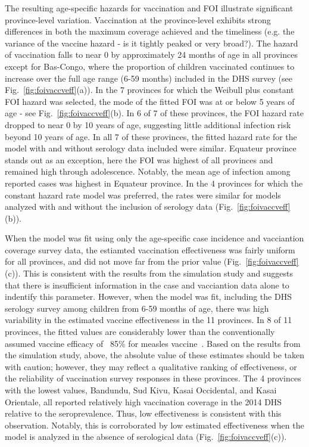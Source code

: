 \documentclass[nofootinbib,aps,pre,twocolumn,superscriptaddress,showkeys,showpacs]{revtex4-1}
\begin{document}
The resulting age-specific hazards for vaccination and FOI illustrate significant province-level variation.  Vaccination at the province-level exhibits strong differences in both the maximum coverage achieved and the timeliness (e.g. the variance of the vaccine hazard - is it tightly peaked or very broad?).  The hazard of vaccination falls to near 0 by approximately 24 months of age in all provinces except for Bas-Congo, where the proportion of children vaccinated continues to increase over the full age range (6-59 months) included in the DHS survey (see Fig.~\ref{fig:foivaccveff}(a)). In the 7 provinces for which the Weibull plus constant FOI hazard was selected, the mode of the fitted FOI was at or below 5 years of age - see Fig.~\ref{fig:foivaccveff}(b).  In 6 of 7 of these provinces, the FOI hazard rate dropped to near 0 by 10 years of age, suggesting little additional infection risk beyond 10 years of age.  In all 7 of these provinces, the fitted hazard rate for the model with and without serology data included were similar.  Equateur province stands out as an exception, here the FOI was highest of all provinces and remained high through adolescence. Notably, the mean age of infection among reported cases was highest in Equateur province. In the 4 provinces for which the constant hazard rate model was preferred, the rates were similar for models analyzed with and without the inclusion of serology data (Fig.~\ref{fig:foivaccveff}(b)).

When the model was fit using only the age-specific case incidence and vacciantion coverage survey data, the estiamted vaccination effectiveness was fairly uniform for all provinces, and did not move far from the prior value (Fig.~\ref{fig:foivaccveff}(c)).  This is consistent with the results from the simulation study and suggests that there is insufficient information in the case and vacciantion data alone to indentify this parameter.  However, when the model was fit, including the DHS serology survey among children from 6-59 months of age, there was high variability in the estimated vaccine effectiveness in the 11 provinces.  In 8 of 11 provinces, the fitted values are considerably lower than the conventionally assumed vaccine efficacy of ~85\% for measles vaccine~\cite{Uzicanin2011}. Based on the results from the simulation study, above, the absolute value of these estimates should be taken with caution; however, they may reflect a qualitative ranking of effectiveness, or the reliability of vaccination survey responses in these provinces.  The 4 provinces with the lowest values, Bandundu, Sud Kivu, Kasai Occidental, and Kasai Orientale, all reported relatively high vaccination coverage in the 2014 DHS relative to the seroprevalence.  Thus, low effectiveness is consistent with this observation.  Notably, this is corroborated by low estimated effectiveness when the model is analyzed in the absence of serological data  (Fig.~\ref{fig:foivaccveff}(c)).
\end{document}
